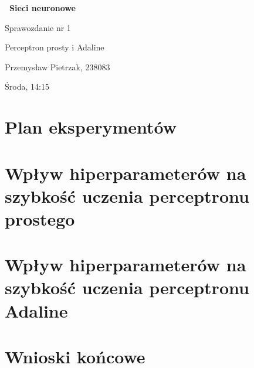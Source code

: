 \documentclass[a4paper,10pt]{article}
\begin{document}
    \begin{titlepage}
     \vspace*{\fill}
    
     \vspace*{-4cm}
     \centering
     \Huge\bfseries\
     {Sieci neuronowe}
    
     \LARGE
     \centering
     \vspace{2cm}
     {Sprawozdanie nr 1}
    
     \Large
     \centering
     {Perceptron prosty i Adaline}
     
     \vspace*{0.5cm}
     
     \centering
     \large 
     \vspace{0.5cm}
     Przemysław Pietrzak, 238083
     
     Środa, 14:15
     
     \vspace*{\fill}
     \restoregeometry
    \end{titlepage}
    
    \newpage
    \tableofcontents
    
    \newpage
    \justify
    \section{Plan eksperymentów}
    
    
    \newpage
    \justify
    \section{Wpływ hiperparameterów na szybkość uczenia perceptronu prostego}
    
    
    \newpage
    \justify
    \section{Wpływ hiperparameterów na szybkość uczenia perceptronu Adaline}
    
    
    \newpage
    \justify
    \section{Wnioski końcowe}
    
    
\end{document}
